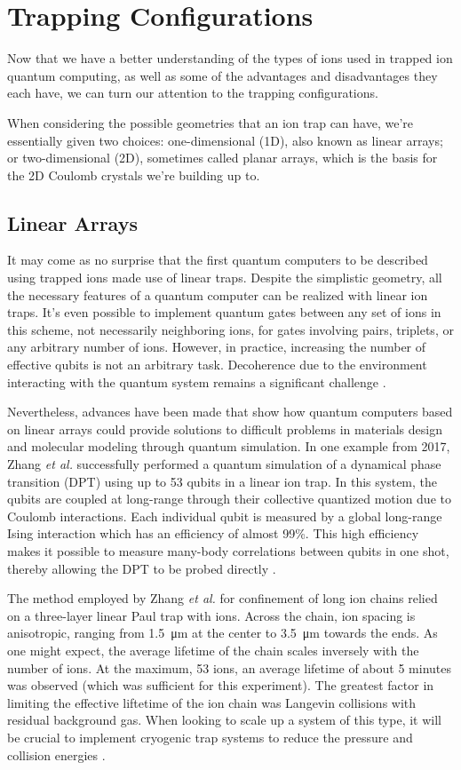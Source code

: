 \section{Trapping Configurations}
Now that we have a better understanding of the types of ions used in trapped ion quantum computing, as well as some of the advantages and disadvantages they each have, we can turn our attention to the trapping configurations. 

When considering the possible geometries that an ion trap can have, we're essentially given two choices: one-dimensional (1D), also known as linear arrays; or two-dimensional (2D), sometimes called planar arrays, which is the basis for the 2D Coulomb crystals we're building up to. 

\subsection{Linear Arrays}
It may come as no surprise that the first quantum computers to be described using trapped ions made use of linear traps. Despite the simplistic geometry, all the necessary features of a quantum computer can be realized with linear ion traps. It's even possible to implement quantum gates between any set of ions in this scheme, not necessarily neighboring ions, for gates involving pairs, triplets, or any arbitrary number of ions. However, in practice, increasing the number of effective qubits is not an arbitrary task. Decoherence due to the environment interacting with the quantum system remains a significant challenge \cite{Cirac}.

Nevertheless, advances have been made that show how quantum computers based on linear arrays could provide solutions to difficult problems in materials design and molecular modeling through quantum simulation. In one example from 2017, Zhang \textit{et al.} successfully performed a quantum simulation of a dynamical phase transition (DPT) using up to 53 qubits in a linear ion trap. In this system, the qubits are coupled at long-range through their collective quantized motion due to Coulomb interactions. Each individual qubit is measured by a global long-range Ising interaction which has an efficiency of almost 99\%. This high efficiency makes it possible to measure many-body correlations between qubits in one shot, thereby allowing the DPT to be probed directly \cite{Zhang}.

The method employed by Zhang \textit{et al.} for confinement of long ion chains relied on a three-layer linear Paul trap with  ions. Across the chain, ion spacing is anisotropic, ranging from \SI{1.5}{\micro\meter} at the center to \SI{3.5}{\micro\meter} towards the ends. As one might expect, the average lifetime of the chain scales inversely with the number of ions. At the maximum, 53 ions, an average lifetime of about 5 minutes was observed (which was sufficient for this experiment). The greatest factor in limiting the effective liftetime of the ion chain was Langevin collisions with residual background gas. When looking to scale up a system of this type, it will be crucial to implement cryogenic trap systems to reduce the pressure and collision energies \cite{Zhang}. 

